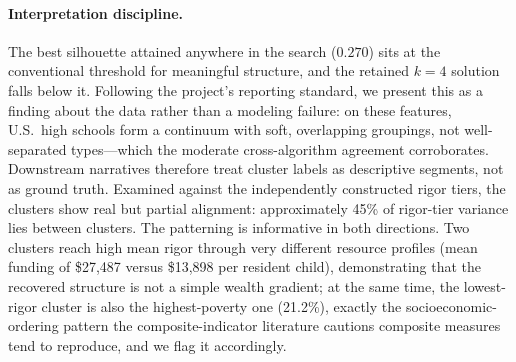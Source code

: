 \paragraph{Interpretation discipline.}
The best silhouette attained anywhere in the search ($0.270$) sits at the conventional
threshold for meaningful structure, and the retained $k=4$ solution falls below it. Following
the project's reporting standard, we present this as a finding about the data rather than a
modeling failure: on these features, U.S.\ high schools form a continuum with soft, overlapping
groupings, not well-separated types---which the moderate cross-algorithm agreement corroborates.
Downstream narratives therefore treat cluster labels as descriptive segments, not as ground
truth. Examined against the independently constructed rigor tiers, the clusters show real but
partial alignment: approximately 45\% of rigor-tier variance lies between clusters. The
patterning is informative in both directions. Two clusters reach high mean rigor through very
different resource profiles (mean funding of \$27{,}487 versus \$13{,}898 per resident child),
demonstrating that the recovered structure is not a simple wealth gradient; at the same time,
the lowest-rigor cluster is also the highest-poverty one (21.2\%), exactly the
socioeconomic-ordering pattern the composite-indicator literature cautions composite measures
tend to reproduce, and we flag it accordingly.

